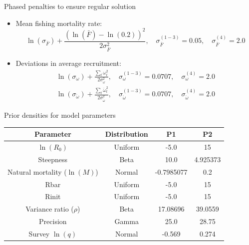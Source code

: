 \begin{frame}[t,allowframebreaks]
	\framebreak
	\begin{block}	
		{Phased penalties to ensure regular solution}
		\begin{itemize}
			\item  Mean fishing mortality rate:
			\[  \ln(\sigma_{\bar{F}}) + \frac{(\ln(\bar{F})-\ln(0.2))^2}{2\sigma_{\bar{F}}^2},
			\quad \sigma_{\bar{F}}^{(1-3)}=0.05, \quad \sigma_{\bar{F}}^{(4)}=2.0  \]
			
			\item Deviations in average recruitment:
			\begin{align}
				\ln(\sigma_{\omega}) + \frac{\sum_t\omega_t^2}{2\sigma_{\omega}^2},
				\quad \sigma_{\omega}^{(1-3)}=0.0707, \quad \sigma_{\omega}^{(4)}=2.0 \nonumber\\
				\ln(\sigma_{\ddot{\omega}}) + \frac{\sum_t\ddot{\omega}_t^2}{2\sigma_{\ddot{\omega}}^2},
				\quad \sigma_{\ddot{\omega}}^{(1-3)}=0.0707, \quad \sigma_{\ddot{\omega}}^{(4)}=2.0\nonumber
			\end{align}
		\end{itemize}
	\end{block}
	
	\framebreak
	\begin{block}	
		{Prior densities for model parameters}
 			\begin{tabular}{cccc}
			\hline
			Parameter & Distribution  & P1 & P2 \\
			\hline
			$\ln(R_0)$ & Uniform &  -5.0 & 15 \\
			Steepness & Beta &  10.0 & 4.925373\\
			Natural mortality ($\ln(M)$) &  Normal &   -0.7985077 & 0.2\\
			Rbar & Uniform &  -5.0 & 15 \\
			Rinit & Uniform &   -5.0 & 15 \\
			Variance ratio ($\rho$) & Beta & 17.08696 & 39.0559 \\
			Precision & Gamma &  25.0 & 28.75\\
			Survey $\ln(q)$ &Normal &  -0.569 & 0.274\\
			\hline
			\end{tabular}	
	\end{block}
	

\end{frame}
